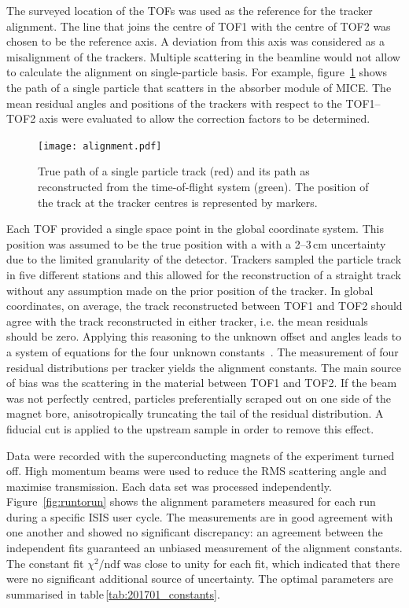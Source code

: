The surveyed location of the TOFs was used as the reference for the tracker alignment. The line that joins the centre of TOF1 with the centre of TOF2 was chosen to be the reference axis. A deviation from this axis was considered as a misalignment of the trackers. Multiple scattering in the beamline would not allow to calculate the alignment on single-particle basis. For example, figure~\ref{fig:align_bl} shows the path of a single particle that scatters in the absorber module of MICE.
 The mean residual angles and positions of the trackers with respect to the TOF1--TOF2 axis were evaluated to allow the correction factors to be determined.

\begin{figure}
	\begin{center}
		\texttt{[image: alignment.pdf]}
	\end{center}
	\caption{
		True path of a single particle track (red) and its path as reconstructed from the time-of-flight system (green). The position of the track at the tracker centres is represented by markers.
	}
	\label{fig:align_bl}
\end{figure}

Each TOF provided a single space point in the global coordinate system. This position was assumed to be the true position with a with a 2--3\,cm uncertainty due to the limited granularity of the detector.
Trackers sampled the particle track in five different stations and this allowed for the reconstruction of a straight track without any assumption made on the prior position of the tracker.
In global coordinates, on average, the track reconstructed between TOF1 and TOF2 should agree with the track reconstructed in either tracker, i.e. the mean residuals should be zero. Applying this reasoning to the unknown offset and angles leads to a system of equations for the four unknown constants~\cite{2018arXiv1805.06623T}.
The measurement of four residual distributions per tracker yields the alignment constants.
The main source of bias was the scattering in the material between TOF1 and TOF2. If the beam was not perfectly centred, particles preferentially scraped out on one side of the magnet bore, anisotropically truncating the tail of the residual distribution.
A fiducial cut is applied to the upstream sample in order to remove this effect.

Data were recorded with the superconducting magnets of the experiment turned off. High momentum beams were used to reduce the RMS scattering angle and maximise transmission.  
Each data set was processed independently. Figure~\ref{fig:runtorun} shows the alignment parameters measured for each run during a specific ISIS user cycle. The measurements are in good agreement with one another and showed no significant discrepancy: an agreement between the independent fits guaranteed an unbiased measurement of the alignment constants. The constant fit $\chi^2/\text{ndf}$ was close to unity for each fit, which indicated that there were no significant additional source of uncertainty. The optimal parameters are summarised in table\,\ref{tab:201701_constants}. 

